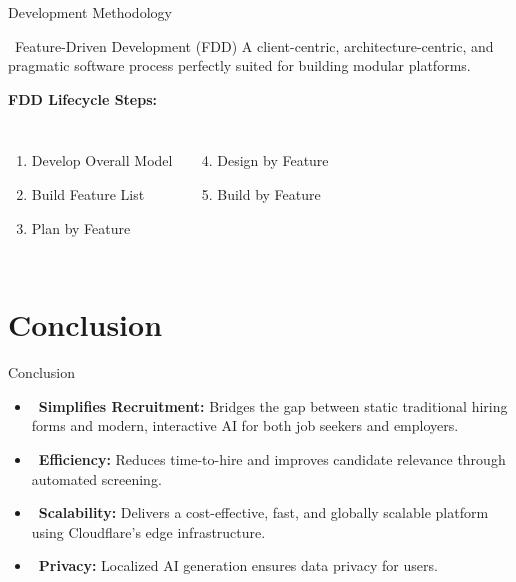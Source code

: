 \documentclass[aspectratio=169]{beamer}
\newcommand{\cookiecheck}{{\color{mainOrange}\faCheckCircle}}
\newcommand{\cookiekicker}[1]{\textbf{\large #1}}
\begin{document}
\begin{frame}{Development Methodology}
    \begin{block}{\faCodeBranch\ Feature-Driven Development (FDD)}
        A client-centric, architecture-centric, and pragmatic software process perfectly suited for building modular platforms.
    \end{block}
    \vspace{0.3cm}
    \cookiekicker{FDD Lifecycle Steps:}
    \vspace{0.3cm}
    
    \begin{columns}[T,onlytextwidth]
            \begin{enumerate}
                \item Develop Overall Model
                \item Build Feature List
                \item Plan by Feature
            \end{enumerate}
            \begin{enumerate}
                \setcounter{enumi}{3}
                \item Design by Feature
                \item Build by Feature
            \end{enumerate}
    \end{columns}
\end{frame}

\section{Conclusion}

\begin{frame}{Conclusion}
    \begin{itemize}
        \item \cookiecheck\ \textbf{Simplifies Recruitment:} Bridges the gap between static traditional hiring forms and modern, interactive AI for both job seekers and employers.
        \vspace{0.3cm}
        \item \cookiecheck\ \textbf{Efficiency:} Reduces time-to-hire and improves candidate relevance through automated screening.
        \vspace{0.3cm}
        \item \cookiecheck\ \textbf{Scalability:} Delivers a cost-effective, fast, and globally scalable platform using Cloudflare's edge infrastructure.
        \vspace{0.3cm}
        \item \cookiecheck\ \textbf{Privacy:} Localized AI generation ensures data privacy for users.
    \end{itemize}
\end{frame}
\end{document}
